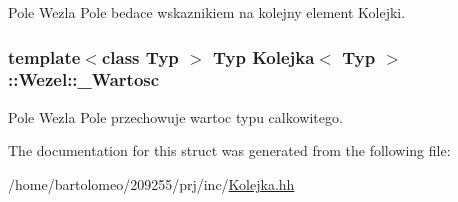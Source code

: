Pole Wezla Pole bedace wskaznikiem na kolejny element Kolejki. 

\hypertarget{struct_kolejka_1_1_wezel_afb3e7fb216cacf18bef1c69c3e38b7f2}{
\subsubsection[{\-\_\-\-Wartosc}]{\setlength{\rightskip}{0pt plus 5cm}template$<$class Typ $>$ Typ {\bf Kolejka}$<$ Typ $>$\-::Wezel\-::\-\_\-\-Wartosc}}\label{struct_kolejka_1_1_wezel_afb3e7fb216cacf18bef1c69c3e38b7f2}


Pole Wezla Pole przechowuje wartoc typu calkowitego. 



The documentation for this struct was generated from the following file\-:\begin{DoxyCompactItemize}
\item 
/home/bartolomeo/209255/prj/inc/\hyperlink{_kolejka_8hh}{Kolejka.\-hh}\end{DoxyCompactItemize}
